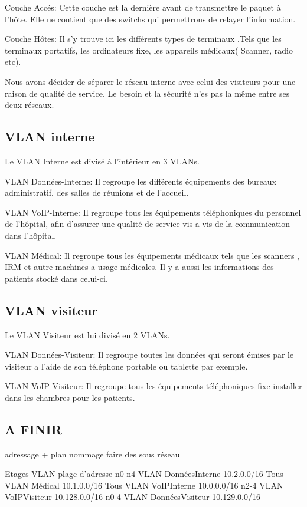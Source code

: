 Couche Accés:
Cette couche est la dernière avant de transmettre le paquet à l'hôte. Elle ne contient que des switchs qui permettrons de relayer l'information.

Couche Hôtes:
Il s'y trouve ici les différents types de terminaux .Tels que les terminaux portatifs, les ordinateurs fixe, les appareils médicaux( Scanner, radio etc).

%
%
Nous avons décider de séparer le réseau interne avec celui des visiteurs pour une raison de qualité de service.
Le besoin et la sécurité n'es pas la même entre ses deux réseaux.

%
%
\subsection{VLAN interne}

Le VLAN Interne est divisé à l'intérieur en 3 VLANs.

VLAN Données-Interne:
Il regroupe les différents équipements des bureaux administratif, des salles de réunions et de l'accueil.

VLAN VoIP-Interne:
Il regroupe tous les équipements téléphoniques du personnel de l'hôpital, afin d'assurer une qualité de service vis a vis de la communication dans l'hôpital.

VLAN Médical:
Il regroupe tous les équipements médicaux tels que les scanners , IRM et autre machines a usage médicales. Il y a aussi les informations des patients stocké dans celui-ci.

%
%
\subsection{VLAN visiteur}

Le VLAN Visiteur est lui divisé en 2 VLANs.

VLAN Données-Visiteur:
Il regroupe toutes les données qui seront émises par le visiteur a l'aide de son téléphone portable ou tablette par exemple.

VLAN VoIP-Visiteur:
Il regroupe  tous les équipements téléphoniques fixe installer dans les chambres pour les patients.



%
%
\subsection{A FINIR}

adressage + plan nommage
faire des sous réseau

Etages
VLAN
plage d’adresse
n0-n4
VLAN DonnéesInterne
10.2.0.0/16
Tous
VLAN Médical
10.1.0.0/16
Tous
VLAN VoIPInterne
10.0.0.0/16
n2-4
VLAN
VoIPVisiteur
10.128.0.0/16
n0-4
VLAN DonnéesVisiteur
10.129.0.0/16

